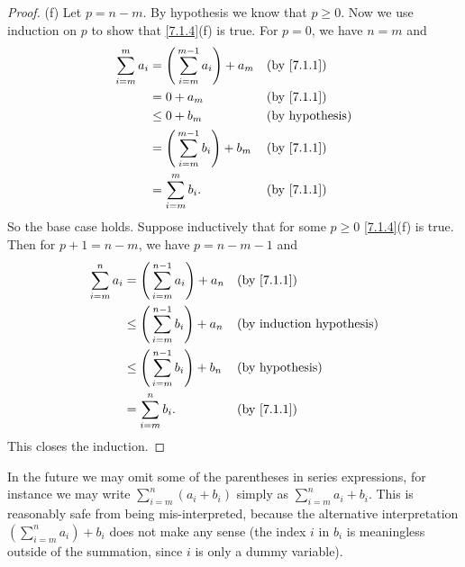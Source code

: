 \begin{proof}{(f)}
  Let \(p = n - m\).
  By hypothesis we know that \(p \geq 0\).
  Now we use induction on \(p\) to show that \cref{7.1.4}(f) is true.
  For \(p = 0\), we have \(n = m\) and
  \begin{align*}
    \sum_{i = m}^m a_i & = \Bigg(\sum_{i = m}^{m - 1} a_i\Bigg) + a_m &  & \by{7.1.1}             \\
                       & = 0 + a_m                                    &  & \by{7.1.1}             \\
                       & \leq 0 + b_m                                 &  & \text{(by hypothesis)} \\
                       & = \Bigg(\sum_{i = m}^{m - 1} b_i\Bigg) + b_m &  & \by{7.1.1}             \\
                       & = \sum_{i = m}^m b_i.                        &  & \by{7.1.1}             \\
  \end{align*}
  So the base case holds.
  Suppose inductively that for some \(p \geq 0\) \cref{7.1.4}(f) is true.
  Then for \(p + 1 = n - m\), we have \(p = n - m - 1\) and
  \begin{align*}
    \sum_{i = m}^n a_i & = \Bigg(\sum_{i = m}^{n - 1} a_i\Bigg) + a_n    &  & \by{7.1.1}             \\
                       & \leq \Bigg(\sum_{i = m}^{n - 1} b_i\Bigg) + a_n &  & \byIH                  \\
                       & \leq \Bigg(\sum_{i = m}^{n - 1} b_i\Bigg) + b_n &  & \text{(by hypothesis)} \\
                       & = \sum_{i = m}^n b_i.                           &  & \by{7.1.1}             \\
  \end{align*}
  This closes the induction.
\end{proof}

\begin{rmk}\label{7.1.5}
  In the future we may omit some of the parentheses in series expressions, for instance we may write \(\sum_{i = m}^n (a_i + b_i)\) simply as \(\sum_{i = m}^n a_i + b_i\).
  This is reasonably safe from being mis-interpreted, because the alternative interpretation \((\sum_{i = m}^n a_i) + b_i\) does not make any sense
  (the index \(i\) in \(b_i\) is meaningless outside of the summation, since \(i\) is only a dummy variable).
\end{rmk}


